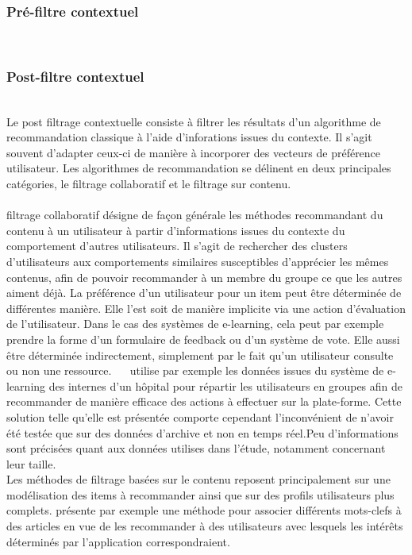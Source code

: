 \documentclass[conference]{./sty/IEEEtran}
\begin{document}
\subsubsection{Pré-filtre contextuel}
~\\

\subsubsection{Post-filtre contextuel}
~\\Le post filtrage contextuelle consiste à filtrer les résultats d'un algorithme de recommandation classique à l'aide d'inforations issues du contexte\cite{DBLP:journals/tlt/VerbertMOWDBD12}. Il s'agit souvent d'adapter ceux-ci de manière à incorporer des vecteurs de préférence utilisateur. Les algorithmes de recommandation se délinent en deux principales catégories, le filtrage collaboratif et le filtrage sur contenu.\\
~\\\Le filtrage collaboratif désigne de façon générale les méthodes recommandant du contenu à un utilisateur à partir d'informations issues du contexte du comportement d'autres utilisateurs. Il s'agit de rechercher des clusters d'utilisateurs aux comportements similaires susceptibles d'apprécier les mêmes contenus, afin de pouvoir recommander à un membre du groupe ce que les autres aiment déjà. La préférence d'un utilisateur pour un item peut être déterminée de différentes manière. Elle l'est soit de manière implicite via une action d'évaluation de l'utilisateur. Dans le cas des systèmes de e-learning, cela peut par exemple prendre la forme d'un formulaire de feedback ou d'un système de vote. Elle aussi être déterminée indirectement, simplement par le fait qu'un utilisateur consulte ou non une ressource. ~\ \cite{Liou:2014:CPL:2617848.2617854} utilise par exemple les données issues du système de  e-learning des internes d'un hôpital pour répartir les utilisateurs en groupes afin de recommander de manière efficace des actions à effectuer sur la plate-forme. Cette solution telle qu'elle est présentée comporte cependant l'inconvénient de n'avoir été testée que sur des données d'archive et non en temps réel.Peu d'informations sont précisées quant aux données utilises dans l'étude, notamment concernant leur taille. 
~\\Les méthodes de filtrage basées sur le contenu reposent principalement sur une modélisation des items à recommander ainsi que sur des profils utilisateurs plus complets. \cite{DBLP:journals/jucs/SternKHKL10} présente par exemple une méthode pour associer différents mots-clefs à des articles en vue de les recommander à des utilisateurs avec lesquels les intérêts déterminés par l'application correspondraient. 
\end{document}

